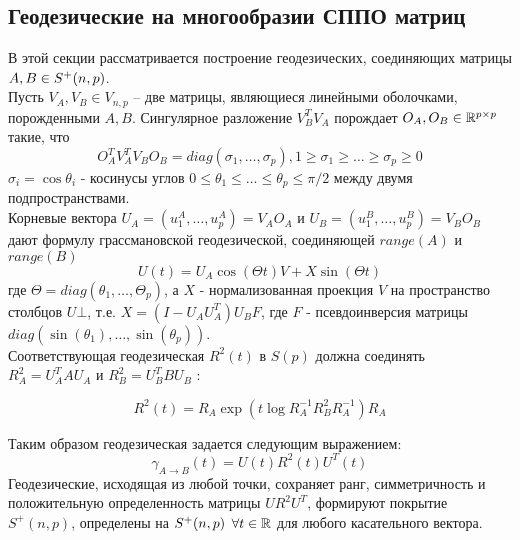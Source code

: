 \subsection{Геодезические на многообразии СППО матриц}
В этой секции рассматривается построение геодезических, соединяющих матрицы $A,B \in S^+(n,p)$. \\
Пусть $V_A, V_B \in V_{n,p}$ – две матрицы, являющиеся линейными оболочками, порожденными $A, B$. Сингулярное разложение $V_B^TV_A$ порождает $O_A, O_B \in \mathbb{R}^{p \times p}$ такие, что
\begin{equation} \label{OVVO}
      O_A^TV_A^TV_BO_B = diag(\sigma_1, \ldots, \sigma_p), 1 \geq \sigma_1 \geq \ldots \geq \sigma_p \geq 0
\end{equation}
$\sigma_i =  \cos \theta_i$ - косинусы углов $0 \leq \theta_1 \leq \ldots \leq \theta_p \leq \pi/2$ между двумя подпространствами.\\
Корневые вектора $ U_A=(u_1^A, \ldots, u_p^A) = V_AO_A $ и $U_B=(u_1^B, \ldots, u_p^B) = V_BO_B$ дают формулу грассмановской геодезической, соединяющей $range(A)$ и $range(B)$
\begin{equation}
     \label{grassman_geodesics}
     U(t) = U_A \cos(\Theta t)V + X \sin(\Theta t)
\end{equation}
где $\Theta = diag(\theta_1, \ldots, \Theta_p)$, а $X$ - нормализованная проекция $V$ на пространство столбцов $U\bot$, т.е. 
$X=(I-U_AU_A^T)U_BF$, где $F$ - псевдоинверсия матрицы $diag(\sin(\theta_1), \ldots, \sin(\theta_p))$. \\
Соответствующая геодезическая $R^2(t)$ в $S(p)$ должна соединять $R_A^2=U_A^TAU_A$ и $R_B^2=U_B^TBU_B$ :

\begin{equation}
     \label{p-geodesics}
     R^2(t) = R_A \exp(t\log R^{-1}_AR^2_BR^{-1}_A)R_A
\end{equation}

Таким образом геодезическая задается следующим выражением:
\begin{equation}
     \label{spsd_geodesics}
     \gamma_{A \rightarrow B}(t) = U(t)R^2(t)U^T(t)
\end{equation}
Геодезические, исходящая из любой точки, сохраняет ранг, симметричность и положительную определенность матрицы $UR^2U^T$, формируют покрытие $S^+(n,p)$, определены на $S^+(n,p)$ $\forall t \in \mathbb{R}$ для любого касательного вектора. \\

